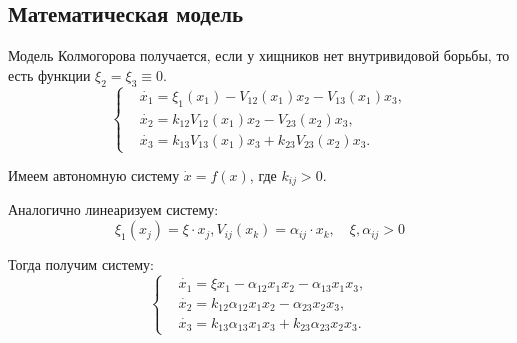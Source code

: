  \subsection{Математическая модель}
    Модель Колмогорова получается, если у хищников нет внутривидовой борьбы, то есть функции 
    \( \xi_2 = \xi_3 \equiv 0 \).
    \[
        \left\{\begin{split}
            & \dot{x_1} = \xi_1(x_1) - V_{12}(x_1)x_2 - V_{13}(x_1)x_3, \\
            & \dot{x_2} = k_{12} V_{12}(x_1)x_2 - V_{23}(x_2)x_3, \\
            & \dot{x_3} = k_{13} V_{13}(x_1)x_3 + k_{23} V_{23}(x_2)x_3. 
        \end{split}\right.
    \]
    
    Имеем автономную систему \( \dot{x} = f(x) \), где \( k_{ij} > 0 \).

    Аналогично линеаризуем систему: 
    \[ \xi_1(x_j) = \xi \cdot x_j, V_{ij}(x_k) = \alpha_{ij} \cdot x_k, \quad \xi, \alpha_{ij} > 0 \]

    Тогда получим систему:
    \[
        \left\{\begin{split}
            & \dot{x_1} = \xi x_1 - \alpha_{12} x_1 x_2 - \alpha_{13} x_1 x_3, \\
            & \dot{x_2} = k_{12} \alpha_{12} x_1 x_2 - \alpha_{23} x_2 x_3, \\
            & \dot{x_3} = k_{13} \alpha_{13} x_1 x_3 + k_{23} \alpha_{23} x_2 x_3. 
        \end{split}\right.
    \]